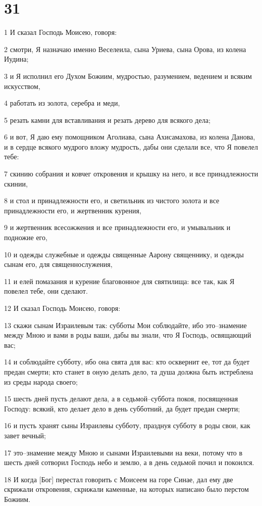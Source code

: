 \chapter{31}

\par 1 И сказал Господь Моисею, говоря:
\par 2 смотри, Я назначаю именно Веселеила, сына Уриева, сына Орова, из колена Иудина;
\par 3 и Я исполнил его Духом Божиим, мудростью, разумением, ведением и всяким искусством,
\par 4 работать из золота, серебра и меди,
\par 5 резать камни для вставливания и резать дерево для всякого дела;
\par 6 и вот, Я даю ему помощником Аголиава, сына Ахисамахова, из колена Данова, и в сердце всякого мудрого вложу мудрость, дабы они сделали все, что Я повелел тебе:
\par 7 скинию собрания и ковчег откровения и крышку на него, и все принадлежности скинии,
\par 8 и стол и принадлежности его, и светильник из чистого золота и все принадлежности его, и жертвенник курения,
\par 9 и жертвенник всесожжения и все принадлежности его, и умывальник и подножие его,
\par 10 и одежды служебные и одежды священные Аарону священнику, и одежды сынам его, для священнослужения,
\par 11 и елей помазания и курение благовонное для святилища: все так, как Я повелел тебе, они сделают.
\par 12 И сказал Господь Моисею, говоря:
\par 13 скажи сынам Израилевым так: субботы Мои соблюдайте, ибо это--знамение между Мною и вами в роды ваши, дабы вы знали, что Я Господь, освящающий вас;
\par 14 и соблюдайте субботу, ибо она свята для вас: кто осквернит ее, тот да будет предан смерти; кто станет в оную делать дело, та душа должна быть истреблена из среды народа своего;
\par 15 шесть дней пусть делают дела, а в седьмой--суббота покоя, посвященная Господу: всякий, кто делает дело в день субботний, да будет предан смерти;
\par 16 и пусть хранят сыны Израилевы субботу, празднуя субботу в роды свои, как завет вечный;
\par 17 это--знамение между Мною и сынами Израилевыми на веки, потому что в шесть дней сотворил Господь небо и землю, а в день седьмой почил и покоился.
\par 18 И когда [Бог] перестал говорить с Моисеем на горе Синае, дал ему две скрижали откровения, скрижали каменные, на которых написано было перстом Божиим.

